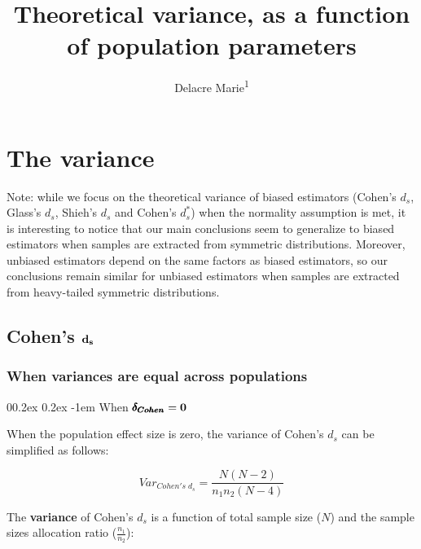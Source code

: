 \documentclass[
  english,
  man]{apa6}
\title{Theoretical variance, as a function of population parameters}
\author{Delacre Marie\textsuperscript{1}}
\date{}
\affiliation{\vspace{0.5cm}\textsuperscript{1} ULB}
\makeatletter
\let\oldparagraph\paragraph
\renewcommand{\paragraph}[1]{\oldparagraph{#1}\mbox{}}
\renewcommand{\paragraph}{\@startsection{paragraph}{4}{\parindent}%
  {0\baselineskip \@plus 0.2ex \@minus 0.2ex}%
  {-1em}%
  {\normalfont\normalsize\bfseries\itshape\typesectitle}}
\makeatother
\begin{document}
\maketitle

\hypertarget{the-variance}{%
\section{The variance}\label{the-variance}}

Note: while we focus on the theoretical variance of biased estimators (Cohen's \(d_s\), Glass's \(d_s\), Shieh's \(d_s\) and Cohen's \(d^*_s\)) when the normality assumption is met, it is interesting to notice that our main conclusions seem to generalize to biased estimators when samples are extracted from symmetric distributions. Moreover, unbiased estimators depend on the same factors as biased estimators, so our conclusions remain similar for unbiased estimators when samples are extracted from heavy-tailed symmetric distributions.

\hypertarget{cohens-bf-d_s}{%
\subsection{\texorpdfstring{Cohen's \(\bf d_s\)}{Cohen's \textbackslash bf d\_s}}\label{cohens-bf-d_s}}

\hypertarget{when-variances-are-equal-across-populations}{%
\subsubsection{When variances are equal across populations}\label{when-variances-are-equal-across-populations}}

\hypertarget{when-bf-pmbdelta_cohen0}{%
\paragraph{\texorpdfstring{When \(\bf \pmb{\delta_{Cohen}}=0\)}{When \textbackslash bf \textbackslash pmb\{\textbackslash delta\_\{Cohen\}\}=0}}\label{when-bf-pmbdelta_cohen0}}

When the population effect size is zero, the variance of Cohen's \(d_s\) can be simplified as follows:

\[Var_{Cohen's \; d_s} = \frac{N(N-2)}{n_1n_2(N-4)}\]

The \textbf{variance} of Cohen's \(d_s\) is a function of total sample size (\(N\)) and the sample sizes allocation ratio (\(\frac{n_1}{n_2}\)):
\end{document}
